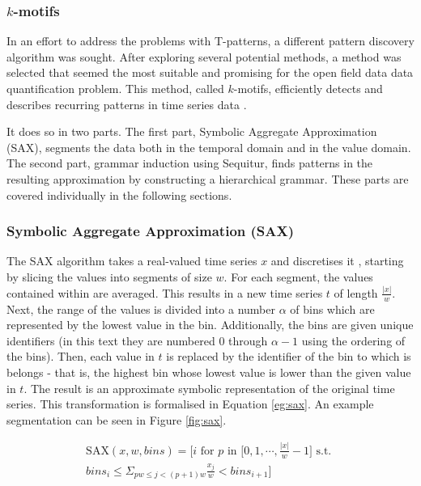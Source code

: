 \documentclass[conference,a4paper,twoside]{IEEEtran}
\begin{document}
\subsubsection{$k$-motifs}
In an effort to address the problems with T-patterns, a different pattern discovery algorithm was sought. After exploring several potential methods, a method was selected that seemed the most suitable and promising for the open field data data quantification problem. This method, called $k$-motifs, efficiently detects and describes recurring patterns in time series data \cite{lonardi2002finding} \cite{li2010approximate}.

It does so in two parts. The first part, Symbolic Aggregate Approximation (SAX), segments the data both in the temporal domain and in the value domain. The second part, grammar induction using Sequitur, finds patterns in the resulting approximation by constructing a hierarchical grammar. These parts are covered individually in the following sections.

\subsubsection{Symbolic Aggregate Approximation (SAX)}
The SAX algorithm takes a real-valued time series $x$ and discretises it \cite{lin2003symbolic}, starting by slicing the values into segments of size $w$. For each segment, the values contained within are averaged. This results in a new time series $t$ of length $\frac{|x|}{w}$. Next, the range of the values is divided into a number $\alpha$ of bins which are represented by the lowest value in the bin. Additionally, the bins are given unique identifiers (in this text they are numbered 0 through $\alpha-1$ using the ordering of the bins). Then, each value in $t$ is replaced by the identifier of the bin to which is belongs - that is, the highest bin whose lowest value is lower than the given value in $t$. The result is an approximate symbolic representation of the original time series. This transformation is formalised in Equation \ref{eg:sax}. An example segmentation can be seen in Figure \ref{fig:sax}.

\begin{equation}
\begin{split}
    \text{SAX}(x,w,bins) = \Big[ i \text{ for } p \text{ in } \big[ 0, 1, \cdots, \frac{|x|}{w} - 1 \big] \text{ s.t. } \\
    bins_i \leq \Sigma_{pw \leq j < (p+1)w} \frac{x_j}{w} < bins_{i+1} \Big]
\end{split}
\label{eg:sax}
\end{equation}
\end{document}
